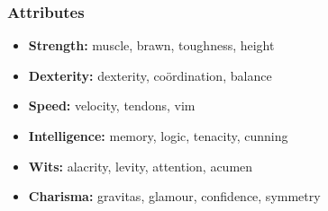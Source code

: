 \subsubsection*{Attributes}

\begin{itemize}
  \item
  \textbf{Strength:} muscle, brawn, toughness, height
  \item
  \textbf{Dexterity:} dexterity, coördination, balance
  \item
  \textbf{Speed:} velocity, tendons, vim
  \item
  \textbf{Intelligence:} memory, logic, tenacity, cunning
  \item
  \textbf{Wits:} alacrity, levity, attention, acumen
  \item
  \textbf{Charisma:} gravitas, glamour, confidence, symmetry
\end{itemize}


